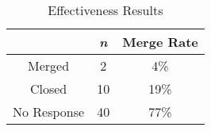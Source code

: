 \begin{table}[h]
\centering
\caption{\toolone Effectiveness Results}
\begin{tabular}{ |c|c|c| } \hline
  & \textit{\textbf{n}} & \textbf{Merge Rate} \\ \hline
 Merged & 2 & 4\% \\ \hline 
 Closed & 10 & 19\% \\ \hline
 No Response & 40 & 77\%\\ \hline 
\end{tabular}
\label{tab:sorry-results}
\end{table}
